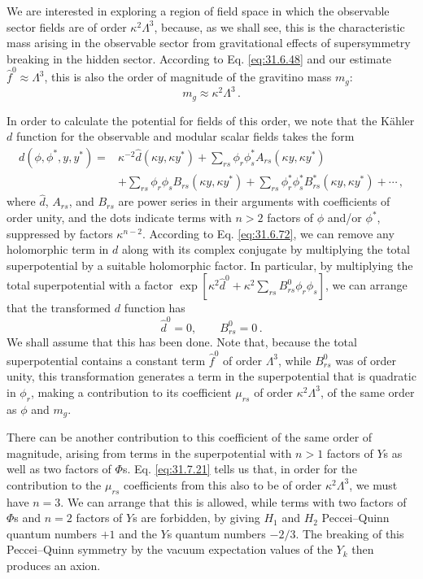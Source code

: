 We are interested in exploring a region of field space in which the
observable sector fields are of order \(\kappa^2\Lambda^3\), because, as we
shall see, this is the characteristic mass arising in the observable sector
from gravitational effects of supersymmetry breaking in the hidden sector.
According to Eq. \eqref{eq:31.6.48} and our estimate
\(\widehat f^0\approx\Lambda^3\), this is also the order of magnitude of the
gravitino mass \(m_g\):
\[
  m_g\approx\kappa^2\Lambda^3\,.
\]

In order to calculate the potential for fields of this order, we note that
the Kähler \(d\) function for the observable and modular scalar fields takes
the form
\begin{equation}
  \begin{aligned}
  d(\phi,\phi^*,y,y^*)={}&
  \kappa^{-2}\widehat d(\kappa y,\kappa y^*)
  +\sum_{rs}\phi_r\phi_s^*A_{rs}(\kappa y,\kappa y^*)
  \\
  &+\sum_{rs}\phi_r\phi_sB_{rs}(\kappa y,\kappa y^*)
  +\sum_{rs}\phi_r^*\phi_s^*B_{rs}^*(\kappa y,\kappa y^*)
  +\cdots\,,
  \end{aligned}
  \tag{31.7.23}\label{eq:31.7.23}
\end{equation}
where \(\widehat d\), \(A_{rs}\), and \(B_{rs}\) are power series in their
arguments with coefficients of order unity, and the dots indicate terms
with \(n>2\) factors of \(\phi\) and/or \(\phi^*\), suppressed by factors
\(\kappa^{n-2}\). According to Eq. \eqref{eq:31.6.72}, we can remove any
holomorphic term in \(d\) along with its complex conjugate by multiplying
the total superpotential by a suitable holomorphic factor. In particular,
by multiplying the total superpotential with a factor
\(\exp[\kappa^2\widehat d^0+
\kappa^2\sum_{rs}B_{rs}^0\phi_r\phi_s]\), we can arrange that the
transformed \(d\) function has
\begin{equation}
  \widehat d^0=0,\qquad B_{rs}^0=0\,.
  \tag{31.7.24}\label{eq:31.7.24}
\end{equation}
We shall assume that this has been done. Note that, because the total
superpotential contains a constant term \(\widehat f^0\) of order
\(\Lambda^3\), while \(B_{rs}^0\) was of order unity, this transformation
generates a term in the superpotential that is quadratic in \(\phi_r\),
making a contribution to its coefficient \(\mu_{rs}\) of order
\(\kappa^2\Lambda^3\), of the same order as \(\phi\) and \(m_g\).

There can be another contribution to this coefficient of the same order of
magnitude, arising from terms in the superpotential with \(n>1\) factors of
\(Y\)s as well as two factors of \(\Phi\)s. Eq. \eqref{eq:31.7.21} tells us
that, in order for the contribution to the \(\mu_{rs}\) coefficients from
this also to be of order \(\kappa^2\Lambda^3\), we must have \(n=3\). We can
arrange that this is allowed, while terms with two factors of \(\Phi\)s and
\(n=2\) factors of \(Y\)s are forbidden, by giving \(H_1\) and \(H_2\)
Peccei--Quinn quantum numbers \(+1\) and the \(Y\)s quantum numbers
\(-2/3\). The breaking of this Peccei--Quinn symmetry by the vacuum
expectation values of the \(Y_k\) then produces an axion.

